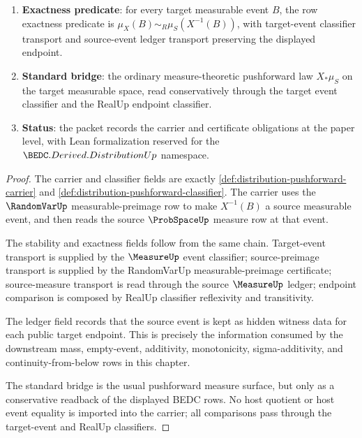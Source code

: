 \begin{theorem}
\begin{enumerate}
\item \textbf{Exactness predicate}: for every target measurable event $B$, the row exactness predicate is $\mu_X(B)\sim_R\mu_S(X^{-1}(B))$, with target-event classifier transport and source-event ledger transport preserving the displayed endpoint.
\item \textbf{Standard bridge}: the ordinary measure-theoretic pushforward law $X_\ast\mu_S$ on the target measurable space, read conservatively through the target event classifier and the RealUp endpoint classifier.
\item \textbf{Status}: the packet records the carrier and certificate obligations at the paper level, with Lean formalization reserved for the $\BEDC.Derived.DistributionUp$ namespace.
\end{enumerate}
\end{theorem}
\begin{proof}
The carrier and classifier fields are exactly \autoref{def:distribution-pushforward-carrier} and \autoref{def:distribution-pushforward-classifier}. The carrier uses the $\RandomVarUp$ measurable-preimage row to make $X^{-1}(B)$ a source measurable event, and then reads the source $\ProbSpaceUp$ measure row at that event.

The stability and exactness fields follow from the same chain. Target-event transport is supplied by the $\MeasureUp$ event classifier; source-preimage transport is supplied by the RandomVarUp measurable-preimage certificate; source-measure transport is read through the source $\MeasureUp$ ledger; endpoint comparison is composed by RealUp classifier reflexivity and transitivity.

The ledger field records that the source event is kept as hidden witness data for each public target endpoint. This is precisely the information consumed by the downstream mass, empty-event, additivity, monotonicity, sigma-additivity, and continuity-from-below rows in this chapter.

The standard bridge is the usual pushforward measure surface, but only as a conservative readback of the displayed BEDC rows. No host quotient or host event equality is imported into the carrier; all comparisons pass through the target-event and RealUp classifiers.
\end{proof}


